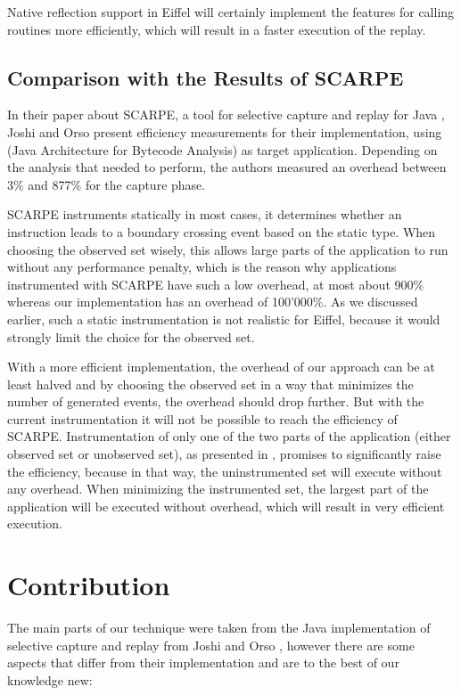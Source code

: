 Native reflection support in Eiffel will certainly implement the features for calling routines more efficiently, which will result in a faster execution of the replay.


\subsection{Comparison with the Results of SCARPE}
In their paper about SCARPE, a tool for selective capture and replay for Java \cite{orso05may}, Joshi and Orso present efficiency measurements for their implementation, using  (Java Architecture for Bytecode Analysis) as target application. Depending on the analysis that  needed to perform, the authors measured an overhead between 3\% and 877\% for the capture phase.

SCARPE instruments statically in most cases, it determines whether an instruction leads to a boundary crossing event based on the static type. When choosing the observed set wisely, this allows large parts of the application to run without any performance penalty, which is the reason why applications instrumented with SCARPE have such a low overhead, at most about 900\% whereas our implementation has an overhead of 100'000\%. As we discussed earlier, such a static instrumentation is not realistic for Eiffel, because it would strongly limit the choice for the observed set.

 With a more efficient implementation, the overhead of our approach can be at least halved and by choosing the observed set in a way that minimizes the number of generated events, the overhead should drop further. But with the current instrumentation it will not be possible to reach the efficiency of SCARPE. Instrumentation of only one of the two parts of the application (either observed set or unobserved set), as presented in , promises to significantly raise the efficiency, because in that way, the uninstrumented set will execute without any overhead. When minimizing the instrumented set, the largest part of the application will be executed without overhead, which will result in very efficient execution.

\section{Contribution}
The main parts of our technique were taken from the Java implementation of selective capture and replay from Joshi and Orso \cite{orso05may}, however there are some aspects that differ from their implementation and are to the best of our knowledge new:

